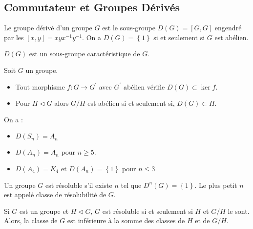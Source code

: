\documentclass{cours}
\begin{document}
\subsection{Commutateur et Groupes Dérivés}

\begin{definition}
    Le groupe dérivé d'un groupe $G$ est le sous-groupe $D(G) = \left[G, G\right]$ engendré par les $\left[x, y\right] = xyx^{-1}y^{-1}$. On a $D(G) = \left\{1\right\}$ si et seulement si $G$ est abélien.
\end{definition}

\begin{corollary}
    $D(G)$ est un sous-groupe caractéristique de $G$.
\end{corollary}

\begin{corollary}
    Soit $G$ un groupe.
    \begin{itemize}
        \item Tout morphisme $f : G \rightarrow G^{'}$ avec $G^{'}$ abélien vérifie $D(G) \subset \ker f$.
        \item Pour $H \lhd G$ alors $G/H$ est abélien si et seulement si, $D(G) \subset H$.
    \end{itemize}
\end{corollary}

\begin{proposition}
    On a :
    \begin{itemize}
        \item $D(S_{n}) = A_{n}$
        \item $D(A_{n}) = A_{n}$ pour $n \geq 5$.
        \item $D(A_{4}) = K_{4}$ et $D(A_{n}) = \left\{1\right\}$ pour $n \leq 3$
    \end{itemize}
\end{proposition}


\begin{definition}
    Un groupe $G$ est résoluble s'il existe $n$ tel que $D^{n}(G) = \left\{1\right\}$. Le plus petit $n$ est appelé classe de résolubilité de $G$.
\end{definition}

\begin{proposition}
    Si $G$ est un groupe et $H \lhd G$, $G$ est résoluble si et seulement si $H$ et $G/H$ le sont. Alors, la classe de $G$ est inférieure à la somme des classes de $H$ et de $G/H$.
\end{proposition}
\end{document}
